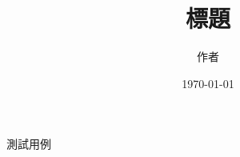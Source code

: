\documentclass[journal]{article} %
\begin{document}
\captionsetup[figure]{name=圖}

\title{標題}
\author{作者}
\date{\today}
\maketitle

\renewcommand\contentsname{目錄}
\tableofcontents



\newpage





測試用例 \cite{8643999}


\newpage
\printbibliography[title={\centering 參考文獻}]
\end{document}
